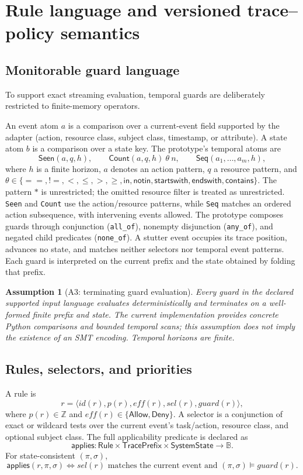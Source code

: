 \documentclass[11pt]{article}
\newtheorem{assumption}{Assumption}[section]
\theoremstyle{remark}
\newcommand{\Bool}{\mathbb{B}}
\newcommand{\Allow}{\mathsf{Allow}}
\newcommand{\Deny}{\mathsf{Deny}}
\begin{document}
\section{Rule language and versioned trace--policy semantics}

\subsection{Monitorable guard language}
To support exact streaming evaluation, temporal guards are deliberately restricted to finite-memory operators.

An event atom $a$ is a comparison over a current-event field supported by the adapter (action, resource class, subject class, timestamp, or attribute). A state atom $b$ is a comparison over a state key. The prototype's temporal atoms are
\[
\mathsf{Seen}(a,q,h),\qquad
\mathsf{Count}(a,q,h)\ \theta\ n,\qquad
\mathsf{Seq}(a_1,\ldots,a_m,h),
\]
where $h$ is a finite horizon, $a$ denotes an action pattern, $q$ a resource pattern, and $\theta\in\{==,!=,<,\leq,>,\geq,\mathsf{in},\mathsf{notin},\mathsf{startswith},\mathsf{endswith},\mathsf{contains}\}$. The pattern $*$ is unrestricted; the omitted resource filter is treated as unrestricted. \texttt{Seen} and \texttt{Count} use the action/resource patterns, while \texttt{Seq} matches an ordered action subsequence, with intervening events allowed. The prototype composes guards through conjunction (\texttt{all\_of}), nonempty disjunction (\texttt{any\_of}), and negated child predicates (\texttt{none\_of}). A stutter event occupies its trace position, advances no state, and matches neither selectors nor temporal event patterns. Each guard is interpreted on the current prefix and the state obtained by folding that prefix.

\begin{assumption}[A3: terminating guard evaluation]
Every guard in the declared supported input language evaluates deterministically and terminates on a well-formed finite prefix and state. The current implementation provides concrete Python comparisons and bounded temporal scans; this assumption does not imply the existence of an SMT encoding. Temporal horizons are finite.
\end{assumption}

\subsection{Rules, selectors, and priorities}

A rule is
\[
r=\langle id(r),p(r),eff(r),sel(r),guard(r)\rangle,
\]
where $p(r)\in\mathbb{Z}$ and $eff(r)\in\{\Allow,\Deny\}$. A selector is a conjunction of exact or wildcard tests over the current event's task/action, resource class, and optional subject class. The full applicability predicate is declared as
\[
\mathsf{applies}:\mathsf{Rule}\times\mathsf{TracePrefix}\times\mathsf{SystemState}\to\Bool.
\]
For state-consistent $(\pi,\sigma)$,
\[
\mathsf{applies}(r,\pi,\sigma)\iff sel(r)\text{ matches the current event and }(\pi,\sigma)\models guard(r).
\]
\end{document}
